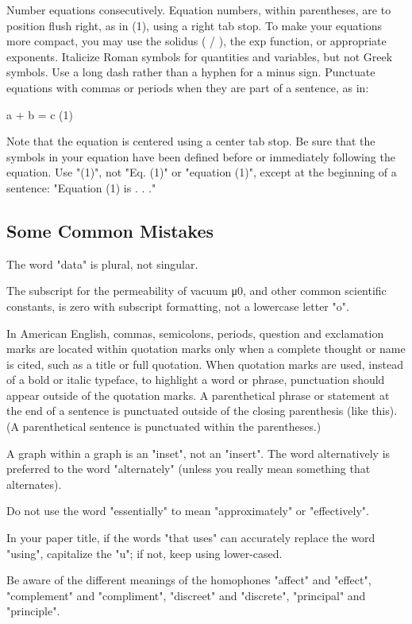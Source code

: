 \documentclass[10pt, conference, compsocconf]{IEEEtran}
\begin{document}
Number equations consecutively. Equation numbers, within parentheses, are to position flush right, as in (1), using a right tab stop. To make your equations more compact, you may use the solidus ( / ), the exp function, or appropriate exponents. Italicize Roman symbols for quantities and variables, but not Greek symbols. Use a long dash rather than a hyphen for a minus sign. Punctuate equations with commas or periods when they are part of a sentence, as in:

a + b = c (1)

Note that the equation is centered using a center tab stop. Be sure that the symbols in your equation have been defined before or immediately following the equation. Use "(1)", not "Eq. (1)" or "equation (1)", except at the beginning of a sentence: "Equation (1) is . . ."

\subsection{Some Common Mistakes}
The word "data" is plural, not singular.

The subscript for the permeability of vacuum μ0, and other common scientific constants, is zero with subscript formatting, not a lowercase letter "o".

In American English, commas, semicolons, periods, question and exclamation marks are located within quotation marks only when a complete thought or name is cited, such as a title or full quotation. When quotation marks are used, instead of a bold or italic typeface, to highlight a word or phrase, punctuation should appear outside of the quotation marks. A parenthetical phrase or statement at the end of a sentence is punctuated outside of the closing parenthesis (like this). (A parenthetical sentence is punctuated within the parentheses.)

A graph within a graph is an "inset", not an "insert". The word alternatively is preferred to the word "alternately" (unless you really mean something that alternates).

Do not use the word "essentially" to mean "approximately" or "effectively".

In your paper title, if the words "that uses" can accurately replace the word "using", capitalize the "u"; if not, keep using lower-cased.

Be aware of the different meanings of the homophones "affect" and "effect", "complement" and "compliment", "discreet" and "discrete", "principal" and "principle".
\end{document}

